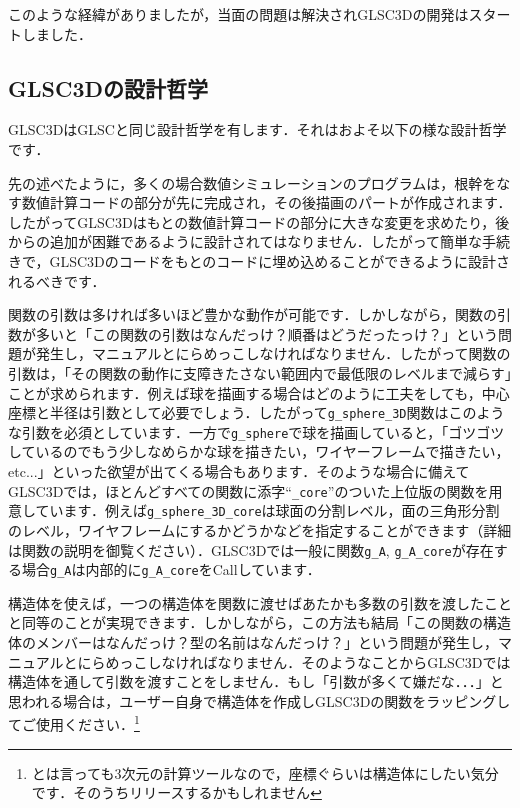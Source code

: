 \documentclass[platex,a4paper,12pt]{jsarticle}%
\begin{document}
このような経緯がありましたが，当面の問題は解決されGLSC3Dの開発はスタートしました．

\subsection{GLSC3Dの設計哲学}

GLSC3DはGLSCと同じ設計哲学を有します．それはおよそ以下の様な設計哲学です．


先の述べたように，多くの場合数値シミュレーションのプログラムは，根幹をなす数値計算コードの部分が先に完成され，その後描画のパートが作成されます．したがってGLSC3Dはもとの数値計算コードの部分に大きな変更を求めたり，後からの追加が困難であるように設計されてはなりません．したがって簡単な手続きで，GLSC3Dのコードをもとのコードに埋め込めることができるように設計されるべきです．


関数の引数は多ければ多いほど豊かな動作が可能です．しかしながら，関数の引数が多いと「この関数の引数はなんだっけ？順番はどうだったっけ？」という問題が発生し，マニュアルとにらめっこしなければなりません．したがって関数の引数は，「その関数の動作に支障きたさない範囲内で最低限のレベルまで減らす」ことが求められます．例えば球を描画する場合はどのように工夫をしても，中心座標と半径は引数として必要でしょう．したがって\verb|g_sphere_3D|関数はこのような引数を必須としています．一方で\verb|g_sphere|で球を描画していると，「ゴツゴツしているのでもう少しなめらかな球を描きたい，ワイヤーフレームで描きたい，etc...」といった欲望が出てくる場合もあります．そのような場合に備えてGLSC3Dでは，ほとんどすべての関数に添字``\verb|_core|''のついた上位版の関数を用意しています．例えば\verb|g_sphere_3D_core|は球面の分割レベル，面の三角形分割のレベル，ワイヤフレームにするかどうかなどを指定することができます（詳細は関数の説明を御覧ください）．GLSC3Dでは一般に関数\verb|g_A|, \verb|g_A_core|が存在する場合\verb|g_A|は内部的に\verb|g_A_core|をCallしています．


構造体を使えば，一つの構造体を関数に渡せばあたかも多数の引数を渡したことと同等のことが実現できます．しかしながら，この方法も結局「この関数の構造体のメンバーはなんだっけ？型の名前はなんだっけ？」という問題が発生し，マニュアルとにらめっこしなければなりません．そのようなことからGLSC3Dでは構造体を通して引数を渡すことをしません．もし「引数が多くて嫌だな．．．」と思われる場合は，ユーザー自身で構造体を作成しGLSC3Dの関数をラッピングしてご使用ください．\footnote{とは言っても3次元の計算ツールなので，座標ぐらいは構造体にしたい気分です．そのうちリリースするかもしれません}
\end{document}
